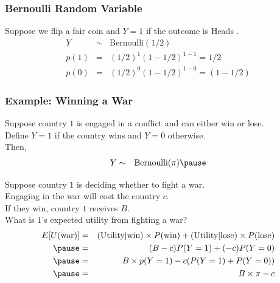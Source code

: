 \documentclass[handout]{beamer}
\numberwithin{equation}{section}
\begin{document}
\begin{frame}
\frametitle{Bernoulli Random Variable}

Suppose we flip a fair coin and $Y = 1$ if the outcome is Heads . \\

\begin{eqnarray}
Y & \sim & \text{Bernoulli}(1/2) \nonumber \\
p(1) & = & (1/2)^{1} (1- 1/2)^{ 1- 1} = 1/2 \nonumber \\
p(0) & = & (1/2)^{0} (1- 1/2)^{1 - 0} = (1- 1/2) \nonumber 
\end{eqnarray}



\end{frame}


\begin{frame}
\frametitle{Example: Winning a War}

Suppose country $1$ is engaged in a conflict and can either win or lose. \pause  \\
Define $Y = 1$ if the country wins and $Y = 0$ otherwise.\\ \pause 
Then,  \pause 
\begin{eqnarray}
Y &\sim & \text{Bernoulli}(\pi) \nonumber \pause 
\end{eqnarray}


Suppose country $1$ is deciding whether to fight a war.  \\\pause 
Engaging in the war will cost the country $c$.  \\ \pause 
If they win, country $1$ receives $B$.  \\ \pause 
What is $1$'s expected utility from fighting a war?\\ \pause 
\begin{eqnarray}
E[U(\text{war})] & = & (\text{Utility}|\text{win})\times P(\text{win}) + (\text{Utility}| \text{lose})\times P(\text{lose}) \nonumber \\ \pause 
&= & (B - c) P(Y = 1) + (- c) P(Y = 0 )\nonumber \\ \pause 
& = & B \times p(Y = 1)  - c(P(Y = 1)  + P(Y = 0)) \nonumber \\ \pause 
& = & B \times \pi - c \nonumber 
\end{eqnarray}
\pause 

\end{frame}
\end{document}
